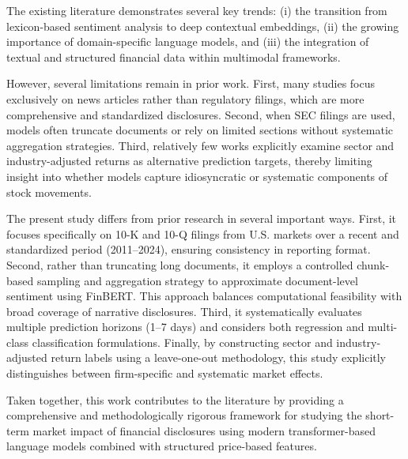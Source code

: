 The existing literature demonstrates several key trends: (i) the transition from lexicon-based sentiment analysis to deep contextual embeddings, (ii) the growing importance of domain-specific language models, and (iii) the integration of textual and structured financial data within multimodal frameworks.

However, several limitations remain in prior work. First, many studies focus exclusively on news articles rather than regulatory filings, which are more comprehensive and standardized disclosures. Second, when SEC filings are used, models often truncate documents or rely on limited sections without systematic aggregation strategies. Third, relatively few works explicitly examine sector and industry-adjusted returns as alternative prediction targets, thereby limiting insight into whether models capture idiosyncratic or systematic components of stock movements.

The present study differs from prior research in several important ways. First, it focuses specifically on 10-K and 10-Q filings from U.S. markets over a recent and standardized period (2011--2024), ensuring consistency in reporting format. Second, rather than truncating long documents, it employs a controlled chunk-based sampling and aggregation strategy to approximate document-level sentiment using FinBERT. This approach balances computational feasibility with broad coverage of narrative disclosures. Third, it systematically evaluates multiple prediction horizons (1--7 days) and considers both regression and multi-class classification formulations. Finally, by constructing sector and industry-adjusted return labels using a leave-one-out methodology, this study explicitly distinguishes between firm-specific and systematic market effects.

Taken together, this work contributes to the literature by providing a comprehensive and methodologically rigorous framework for studying the short-term market impact of financial disclosures using modern transformer-based language models combined with structured price-based features.